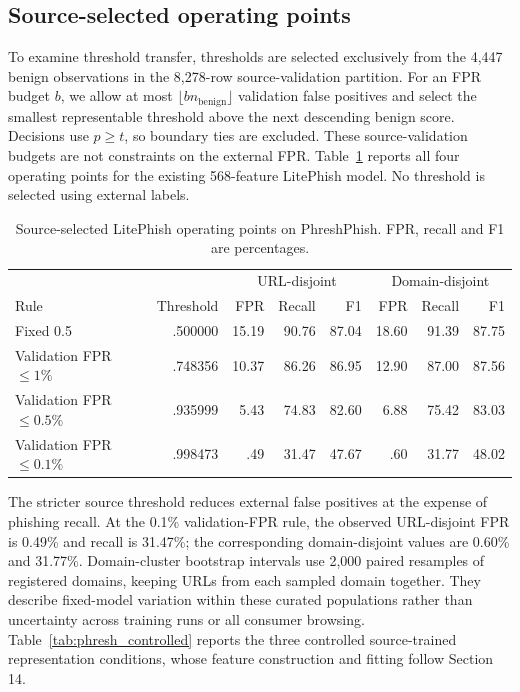 \documentclass[10pt]{article}
\newenvironment{bluechange}{\color{black}}{}
\begin{document}
\begin{bluechange}
\subsection{Source-selected operating points}
To examine threshold transfer, thresholds are selected exclusively from the 4,447 benign observations in the 8,278-row source-validation partition. For an FPR budget $b$, we allow at most $\lfloor b n_{\mathrm{benign}}\rfloor$ validation false positives and select the smallest representable threshold above the next descending benign score. Decisions use $p\geq t$, so boundary ties are excluded. These source-validation budgets are not constraints on the external FPR. Table~\ref{tab:phresh_thresholds} reports all four operating points for the existing 568-feature LitePhish model. No threshold is selected using external labels.

\begin{table}[!ht]
\centering\small\color{black}
\caption{\color{black}Source-selected LitePhish operating points on PhreshPhish. FPR, recall and F1 are percentages.}
\label{tab:phresh_thresholds}
\begin{tabular}{lrrrrrrr}
\toprule
& & \multicolumn{3}{c}{URL-disjoint} & \multicolumn{3}{c}{Domain-disjoint} \\
Rule & Threshold & FPR & Recall & F1 & FPR & Recall & F1 \\
\midrule
Fixed 0.5 & .500000 & 15.19 & 90.76 & 87.04 & 18.60 & 91.39 & 87.75 \\
Validation FPR $\leq1\%$ & .748356 & 10.37 & 86.26 & 86.95 & 12.90 & 87.00 & 87.56 \\
Validation FPR $\leq0.5\%$ & .935999 & 5.43 & 74.83 & 82.60 & 6.88 & 75.42 & 83.03 \\
Validation FPR $\leq0.1\%$ & .998473 & .49 & 31.47 & 47.67 & .60 & 31.77 & 48.02 \\
\bottomrule
\end{tabular}
\end{table}

The stricter source threshold reduces external false positives at the expense of phishing recall. At the 0.1\% validation-FPR rule, the observed URL-disjoint FPR is 0.49\% and recall is 31.47\%; the corresponding domain-disjoint values are 0.60\% and 31.77\%. Domain-cluster bootstrap intervals use 2,000 paired resamples of registered domains, keeping URLs from each sampled domain together. They describe fixed-model variation within these curated populations rather than uncertainty across training runs or all consumer browsing. Table~\ref{tab:phresh_controlled} reports the three controlled source-trained representation conditions, whose feature construction and fitting follow Section 14.


\end{bluechange}
\end{document}
